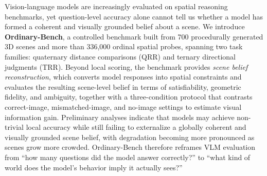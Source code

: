 Vision-language models are increasingly evaluated on spatial reasoning benchmarks, yet question-level accuracy alone cannot tell us whether a model has formed a coherent and visually grounded belief about a scene. We introduce \textbf{Ordinary-Bench}, a controlled benchmark built from 700 procedurally generated 3D scenes and more than 336{,}000 ordinal spatial probes, spanning two task families: quaternary distance comparisons (QRR) and ternary directional judgments (TRR). Beyond local scoring, the benchmark provides \emph{scene belief reconstruction}, which converts model responses into spatial constraints and evaluates the resulting scene-level belief in terms of satisfiability, geometric fidelity, and ambiguity, together with a three-condition protocol that contrasts correct-image, mismatched-image, and no-image settings to estimate visual information gain. Preliminary analyses indicate that models may achieve non-trivial local accuracy while still failing to externalize a globally coherent and visually grounded scene belief, with degradation becoming more pronounced as scenes grow more crowded. Ordinary-Bench therefore reframes VLM evaluation from ``how many questions did the model answer correctly?'' to ``what kind of world does the model's behavior imply it actually sees?''
